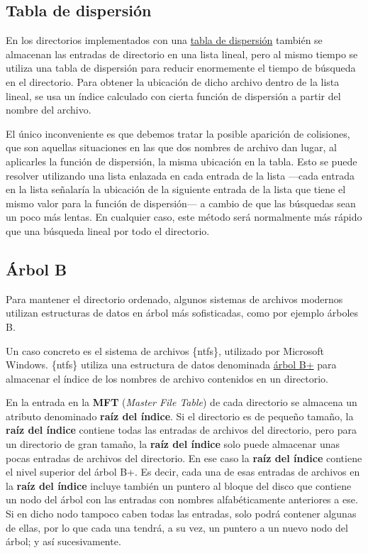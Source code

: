 \subsection{Tabla de dispersión}\label{_tabla_de_dispersiuxf3n}

En los directorios implementados con una
\href{https://es.wikipedia.org/wiki/Tabla_hash}{tabla de dispersión}
también se almacenan las entradas de directorio en una lista lineal,
pero al mismo tiempo se utiliza una tabla de dispersión para reducir
enormemente el tiempo de búsqueda en el directorio. Para obtener la
ubicación de dicho archivo dentro de la lista lineal, se usa un índice
calculado con cierta función de dispersión a partir del nombre del
archivo.

El único inconveniente es que debemos tratar la posible aparición de
colisiones, que son aquellas situaciones en las que dos nombres de
archivo dan lugar, al aplicarles la función de dispersión, la misma
ubicación en la tabla. Esto se puede resolver utilizando una lista
enlazada en cada entrada de la lista ---cada entrada en la lista
señalaría la ubicación de la siguiente entrada de la lista que tiene el
mismo valor para la función de dispersión--- a cambio de que las
búsquedas sean un poco más lentas. En cualquier caso, este método será
normalmente más rápido que una búsqueda lineal por todo el directorio.

\subsection{Árbol B}\label{_uxe1rbol_b}

Para mantener el directorio ordenado, algunos sistemas de archivos
modernos utilizan estructuras de datos en árbol más sofisticadas, como
por ejemplo árboles B.

Un caso concreto es el sistema de archivos \{ntfs\}, utilizado por
Microsoft Windows. \{ntfs\} utiliza una estructura de datos denominada
\href{https://es.wikipedia.org/wiki/\%C3\%81rbol_B\%2B}{árbol B+} para
almacenar el índice de los nombres de archivo contenidos en un
directorio.

En la entrada en la \textbf{{}MFT} (\emph{Master File Table}) de cada
directorio se almacena un atributo denominado \textbf{raíz del índice}.
Si el directorio es de pequeño tamaño, la \textbf{raíz del índice}
contiene todas las entradas de archivos del directorio, pero para un
directorio de gran tamaño, la \textbf{raíz del índice} solo puede
almacenar unas pocas entradas de archivos del directorio. En ese caso la
\textbf{raíz del índice} contiene el nivel superior del árbol B+. Es
decir, cada una de esas entradas de archivos en la \textbf{raíz del
índice} incluye también un puntero al bloque del disco que contiene un
nodo del árbol con las entradas con nombres alfabéticamente anteriores a
ese. Si en dicho nodo tampoco caben todas las entradas, solo podrá
contener algunas de ellas, por lo que cada una tendrá, a su vez, un
puntero a un nuevo nodo del árbol; y así sucesivamente.

